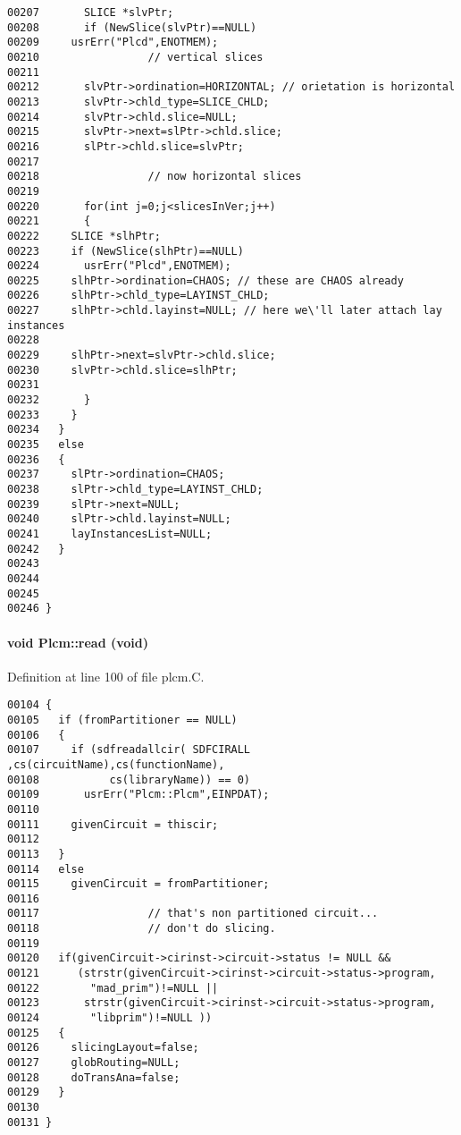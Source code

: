 \begin{verbatim}
00207       SLICE *slvPtr;
00208       if (NewSlice(slvPtr)==NULL)
00209     usrErr("Plcd",ENOTMEM);
00210                 // vertical slices 
00211 
00212       slvPtr->ordination=HORIZONTAL; // orietation is horizontal
00213       slvPtr->chld_type=SLICE_CHLD;
00214       slvPtr->chld.slice=NULL;
00215       slvPtr->next=slPtr->chld.slice;
00216       slPtr->chld.slice=slvPtr;
00217 
00218                 // now horizontal slices
00219 
00220       for(int j=0;j<slicesInVer;j++)
00221       {
00222     SLICE *slhPtr;
00223     if (NewSlice(slhPtr)==NULL)
00224       usrErr("Plcd",ENOTMEM);
00225     slhPtr->ordination=CHAOS; // these are CHAOS already
00226     slhPtr->chld_type=LAYINST_CHLD;
00227     slhPtr->chld.layinst=NULL; // here we\'ll later attach lay instances
00228 
00229     slhPtr->next=slvPtr->chld.slice;
00230     slvPtr->chld.slice=slhPtr;
00231     
00232       }
00233     }
00234   }
00235   else
00236   {
00237     slPtr->ordination=CHAOS;
00238     slPtr->chld_type=LAYINST_CHLD;
00239     slPtr->next=NULL;
00240     slPtr->chld.layinst=NULL;
00241     layInstancesList=NULL;
00242   }
00243 
00244 
00245 
00246 }
\end{verbatim}\normalsize 
\label{Plcm_a2}
\paragraph{\setlength{\rightskip}{0pt plus 5cm}void Plcm::read (void)}\hfill



Definition at line 100 of file plcm.C.\small\begin{verbatim}00104 {
00105   if (fromPartitioner == NULL)
00106   {
00107     if (sdfreadallcir( SDFCIRALL ,cs(circuitName),cs(functionName),
00108           cs(libraryName)) == 0)
00109       usrErr("Plcm::Plcm",EINPDAT);
00110 
00111     givenCircuit = thiscir;
00112 
00113   }
00114   else
00115     givenCircuit = fromPartitioner;
00116 
00117                 // that's non partitioned circuit...
00118                 // don't do slicing.
00119 
00120   if(givenCircuit->cirinst->circuit->status != NULL &&
00121      (strstr(givenCircuit->cirinst->circuit->status->program,
00122        "mad_prim")!=NULL ||
00123       strstr(givenCircuit->cirinst->circuit->status->program,
00124        "libprim")!=NULL ))
00125   {
00126     slicingLayout=false;
00127     globRouting=NULL;
00128     doTransAna=false;
00129   }
00130 
00131 }
\end{verbatim}\normalsize 
\label{Plcm_c0}
